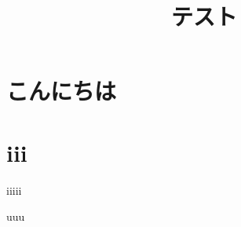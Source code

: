 \documentclass[a4j,epsf,twocolumn]{jarticle}
\title{テスト}
\begin{document}
    \section{こんにちは}

    \section{iii}
        iiiii

    \begin{thebibliography}{99}
         uuu
    \end{thebibliography}
\end{document}
